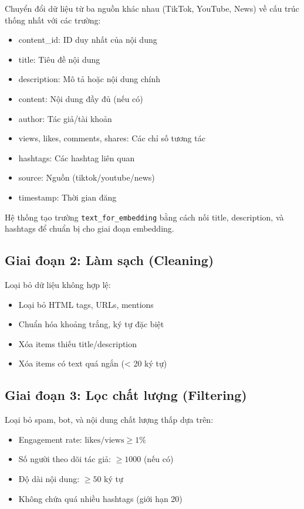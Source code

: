 Chuyển đổi dữ liệu từ ba nguồn khác nhau (TikTok, YouTube, News) về cấu trúc thống nhất với các trường:
\begin{itemize}
    \item content\_id: ID duy nhất của nội dung
    \item title: Tiêu đề nội dung
    \item description: Mô tả hoặc nội dung chính
    \item content: Nội dung đầy đủ (nếu có)
    \item author: Tác giả/tài khoản
    \item views, likes, comments, shares: Các chỉ số tương tác
    \item hashtags: Các hashtag liên quan
    \item source: Nguồn (tiktok/youtube/news)
    \item timestamp: Thời gian đăng
\end{itemize}

Hệ thống tạo trường \texttt{text\_for\_embedding} bằng cách nối title, description, và hashtags để chuẩn bị cho giai đoạn embedding.

\subsection{Giai đoạn 2: Làm sạch (Cleaning)}

Loại bỏ dữ liệu không hợp lệ:
\begin{itemize}
    \item Loại bỏ HTML tags, URLs, mentions
    \item Chuẩn hóa khoảng trắng, ký tự đặc biệt
    \item Xóa items thiếu title/description
    \item Xóa items có text quá ngắn (< 20 ký tự)
\end{itemize}

\subsection{Giai đoạn 3: Lọc chất lượng (Filtering)}

Loại bỏ spam, bot, và nội dung chất lượng thấp dựa trên:
\begin{itemize}
    \item Engagement rate: \(\text{likes/views} \geq 1\%\)
    \item Số người theo dõi tác giả: \(\geq 1000\) (nếu có)
    \item Độ dài nội dung: \(\geq 50\) ký tự
    \item Không chứa quá nhiều hashtags (giới hạn 20)
\end{itemize}


